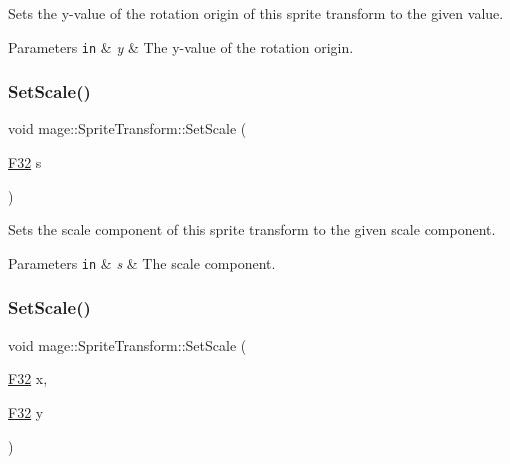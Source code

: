 Sets the y-\/value of the rotation origin of this sprite transform to the given value.


\begin{DoxyParams}[1]{Parameters}
\mbox{\tt in}  & {\em y} & The y-\/value of the rotation origin. \\
\hline
\end{DoxyParams}
\hypertarget{structmage_1_1_sprite_transform_ad11fab7a12f6d1ce79eab12e16adab93}{}\label{structmage_1_1_sprite_transform_ad11fab7a12f6d1ce79eab12e16adab93} 
\subsubsection{\texorpdfstring{Set\+Scale()}{SetScale()}\hspace{0.1cm}{\footnotesize\ttfamily [1/4]}}
{\footnotesize\ttfamily void mage\+::\+Sprite\+Transform\+::\+Set\+Scale (\begin{DoxyParamCaption}\item[{\hyperlink{namespacemage_aa97e833b45f06d60a0a9c4fc22ae02c0}{F32}}]{s }\end{DoxyParamCaption})\hspace{0.3cm}{\ttfamily [noexcept]}}

Sets the scale component of this sprite transform to the given scale component.


\begin{DoxyParams}[1]{Parameters}
\mbox{\tt in}  & {\em s} & The scale component. \\
\hline
\end{DoxyParams}
\hypertarget{structmage_1_1_sprite_transform_a4f20a52939fc8a7ab285673861d3deae}{}\label{structmage_1_1_sprite_transform_a4f20a52939fc8a7ab285673861d3deae} 
\subsubsection{\texorpdfstring{Set\+Scale()}{SetScale()}\hspace{0.1cm}{\footnotesize\ttfamily [2/4]}}
{\footnotesize\ttfamily void mage\+::\+Sprite\+Transform\+::\+Set\+Scale (\begin{DoxyParamCaption}\item[{\hyperlink{namespacemage_aa97e833b45f06d60a0a9c4fc22ae02c0}{F32}}]{x,  }\item[{\hyperlink{namespacemage_aa97e833b45f06d60a0a9c4fc22ae02c0}{F32}}]{y }\end{DoxyParamCaption})\hspace{0.3cm}{\ttfamily [noexcept]}}

